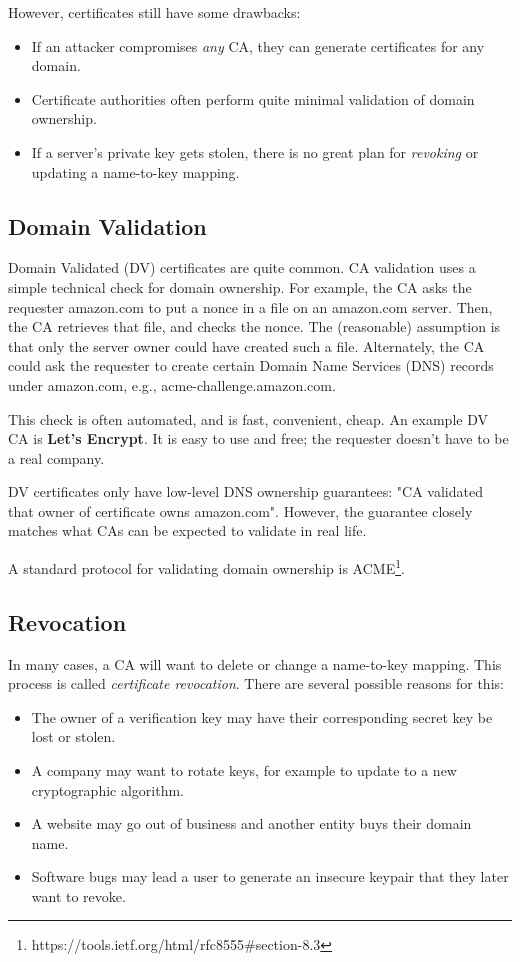 However, certificates still have some drawbacks:
\begin{itemize}[noitemsep]
  \item If an attacker compromises \emph{any} CA, they can generate certificates for any domain.
	\item Certificate authorities often perform quite minimal validation of domain ownership.
	\item If a server's private key gets stolen, 
        there is no great plan for \emph{revoking} or updating a name-to-key mapping.
\end{itemize}

\subsection{Domain Validation}

Domain Validated (DV) certificates are quite common. CA validation uses a simple technical check for domain ownership. For example, the CA asks the requester amazon.com to put a nonce in a file on an amazon.com server. Then, the CA retrieves that file, and checks the nonce. The (reasonable) assumption is that only the server owner could have created such a file. Alternately, the CA could ask the requester to create certain Domain Name Services (DNS) records under amazon.com, e.g., acme-challenge.amazon.com.

This check is often automated, and is fast, convenient, cheap. An example DV CA is {\bf Let's Encrypt}. It is easy to use and free; the requester doesn't have to be a real company.

DV certificates only have low-level DNS ownership guarantees: "CA validated that owner of certificate owns amazon.com". However, the guarantee closely matches what CAs can be expected to validate in real life. 

A standard protocol for validating domain ownership is ACME\footnote{https://tools.ietf.org/html/rfc8555\#section-8.3}.

\subsection{Revocation}
In many cases, a CA will want to delete or change a name-to-key mapping.
This process is called \emph{certificate revocation}.
There are several possible reasons for this:
\begin{itemize}[noitemsep]
	\item The owner of a verification key may have their corresponding secret key
        be lost or stolen.
	\item A company may want to rotate keys, 
        for example to update to a new cryptographic algorithm.
	\item A website may go out of business and another entity buys their domain name.
	\item Software bugs may lead a user to generate an
        insecure keypair that they later want to revoke.\autocite{yilek2009private,nemec2017return}
\end{itemize}

